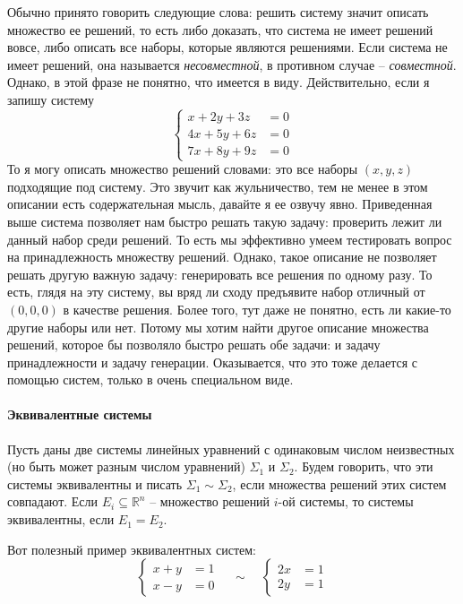Обычно принято говорить следующие слова: решить систему значит описать множество ее решений, то есть либо доказать, что система не имеет решений вовсе, либо описать все наборы, которые являются решениями.
Если система не имеет решений, она называется {\it несовместной}, в противном случае -- {\it совместной}.
Однако, в этой фразе не понятно, что имеется в виду.
Действительно, если я запишу систему
\[
\left\{
\begin{aligned}
x + 2 y + 3z &= 0\\
4x + 5y + 6z &= 0\\
7x + 8y + 9z &= 0
\end{aligned}
\right.
\]
То я могу описать множество решений словами: это все наборы $(x, y, z)$ подходящие под систему.
Это звучит как жульничество, тем не менее в этом описании есть содержательная мысль, давайте я ее озвучу явно.
Приведенная выше система позволяет нам быстро решать такую задачу: проверить лежит ли данный набор среди решений.
То есть мы эффективно умеем тестировать вопрос на принадлежность множеству решений.
Однако, такое описание не позволяет решать другую важную задачу: генерировать все решения по одному разу.
То есть, глядя на эту систему, вы вряд ли сходу предъявите набор отличный от $(0, 0, 0)$ в качестве решения.
Более того, тут даже не понятно, есть ли какие-то другие наборы или нет.
Потому мы хотим найти другое описание множества решений, которое бы позволяло быстро решать обе задачи: и задачу принадлежности и задачу генерации.
Оказывается, что это тоже делается с помощью систем, только в очень специальном виде.

\paragraph{Эквивалентные системы}

Пусть даны две системы линейных уравнений с одинаковым числом неизвестных (но быть может разным числом уравнений) $\Sigma_1$ и $\Sigma_2$.
Будем говорить, что эти системы эквивалентны и писать $\Sigma_1 \sim \Sigma_2$, если множества решений этих систем совпадают.
Если $E_i\subseteq \mathbb R^n$ -- множество решений $i$-ой системы, то системы эквивалентны, если $E_1 = E_2$.

Вот полезный пример эквивалентных систем:
\[
\left\{
\begin{aligned}
x + y &= 1\\
x - y &= 0
\end{aligned}
\right.\quad\sim\quad
\left\{
\begin{aligned}
2x &= 1\\
2y &= 1
\end{aligned}
\right.
\]

